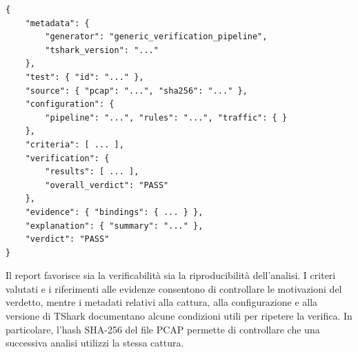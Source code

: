 \par\noindent\begin{minipage}{\linewidth}
\begin{lstlisting}
{
    "metadata": {
        "generator": "generic_verification_pipeline",
        "tshark_version": "..."
    },
    "test": { "id": "..." },
    "source": { "pcap": "...", "sha256": "..." },
    "configuration": {
        "pipeline": "...", "rules": "...", "traffic": { }
    },
    "criteria": [ ... ],
    "verification": {
        "results": [ ... ],
        "overall_verdict": "PASS"
    },
    "evidence": { "bindings": { ... } },
    "explanation": { "summary": "..." },
    "verdict": "PASS"
}
\end{lstlisting}
\end{minipage}\par

Il report favorisce sia la verificabilità sia la riproducibilità dell'analisi. I criteri valutati e i riferimenti alle evidenze consentono di controllare le motivazioni del verdetto, mentre i metadati relativi alla cattura, alla configurazione e alla versione di TShark documentano alcune condizioni utili per ripetere la verifica. In particolare, l'hash SHA-256 del file PCAP permette di controllare che una successiva analisi utilizzi la stessa cattura.
